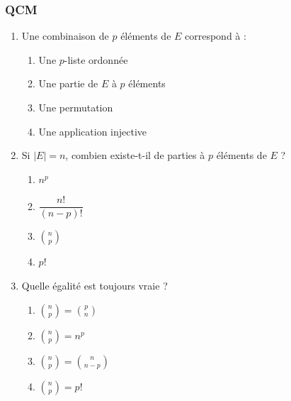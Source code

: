 \documentclass[../PolyS4.tex]{subfiles}
\begin{document}
\subsubsection*{QCM}

\begin{enumerate}
\item Une combinaison de $p$ éléments de $E$ correspond à :
\begin{enumerate}
\item Une $p$-liste ordonnée
\item Une partie de $E$ à $p$ éléments
\item Une permutation
\item Une application injective
\end{enumerate}

\item Si $|E|=n$, combien existe-t-il de parties à $p$ éléments de $E$ ?
\begin{enumerate}
\item $n^p$
\item $\dfrac{n!}{(n-p)!}$
\item $\binom{n}{p}$
\item $p!$
\end{enumerate}

\item Quelle égalité est toujours vraie ?
\begin{enumerate}
\item $\binom{n}{p} = \binom{p}{n}$
\item $\binom{n}{p} = n^p$
\item $\binom{n}{p} = \binom{n}{n-p}$
\item $\binom{n}{p} = p!$
\end{enumerate}
\end{enumerate}
\end{document}
